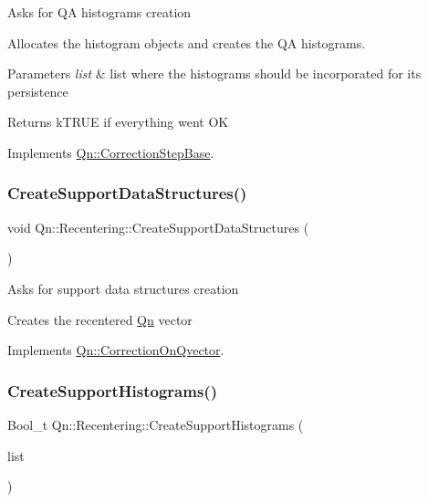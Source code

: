 Asks for QA histograms creation

Allocates the histogram objects and creates the QA histograms. 
\begin{DoxyParams}{Parameters}
{\em list} & list where the histograms should be incorporated for its persistence \\
\hline
\end{DoxyParams}
\begin{DoxyReturn}{Returns}
k\+T\+R\+UE if everything went OK 
\end{DoxyReturn}


Implements \mbox{\hyperlink{classQn_1_1CorrectionStepBase_a21f58f5d91209c1c74d0928cf0b3e26d}{Qn\+::\+Correction\+Step\+Base}}.

\mbox{\label{classQn_1_1Recentering_a6aa8507e24f482af1d7fdd55151b3d34}} 
\subsubsection{\texorpdfstring{Create\+Support\+Data\+Structures()}{CreateSupportDataStructures()}}
{\footnotesize\ttfamily void Qn\+::\+Recentering\+::\+Create\+Support\+Data\+Structures (\begin{DoxyParamCaption}{ }\end{DoxyParamCaption})\hspace{0.3cm}{\ttfamily [virtual]}}

Asks for support data structures creation

Creates the recentered \mbox{\hyperlink{namespaceQn}{Qn}} vector 

Implements \mbox{\hyperlink{classQn_1_1CorrectionOnQvector_ac7c019bc36ac90618ed6e5fc768ca593}{Qn\+::\+Correction\+On\+Qvector}}.

\mbox{\label{classQn_1_1Recentering_accf0f1282e35bd0a94a2d93312ff6ad5}} 
\subsubsection{\texorpdfstring{Create\+Support\+Histograms()}{CreateSupportHistograms()}}
{\footnotesize\ttfamily Bool\+\_\+t Qn\+::\+Recentering\+::\+Create\+Support\+Histograms (\begin{DoxyParamCaption}\item[{T\+List $\ast$}]{list }\end{DoxyParamCaption})\hspace{0.3cm}{\ttfamily [virtual]}}


